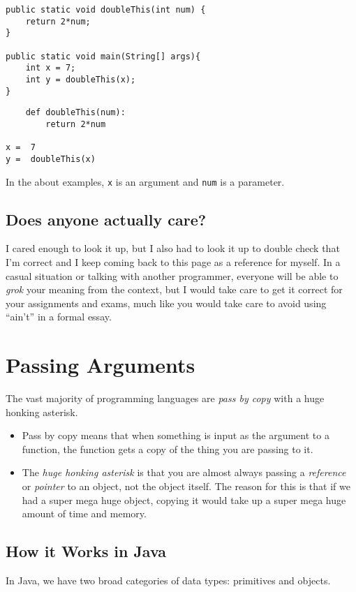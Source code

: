 \begin{verbatim}
public static void doubleThis(int num) { 
	return 2*num;
}

public static void main(String[] args){
	int x = 7;
	int y = doubleThis(x);
}

\end{verbatim}

\begin{verbatim}
	def doubleThis(num): 
		return 2*num
		
x =  7
y =  doubleThis(x)
\end{verbatim}

In the about examples, \texttt{x} is an argument and \texttt{num} is a parameter.


\subsection{Does anyone actually care?}

I cared enough to look it up, but I also had to look it up to double check that I'm correct and I keep coming back to this page as a reference for myself.  
In a casual situation or talking with another programmer, everyone will be able to \textit{grok} your meaning from the context, but I would take care to get it correct for your assignments and exams, much like you would take care to avoid using ``ain't'' in a formal essay.

\section{Passing Arguments}

The vast majority of programming languages are \textit{pass by copy} with a huge honking asterisk.
\begin{itemize}
	\item Pass by copy means that when something is input as the argument to a function, the function gets a copy of the thing you are passing to it.
	\item The \textit{huge honking asterisk} is that you are almost always passing a \textit{reference} or \textit{pointer} to an object, not the object itself.  The reason for this is that if we had a super mega huge object, copying it would take up a super mega huge amount of time and memory.
\end{itemize}



\subsection{How it Works in Java}
In Java, we have two broad categories of data types: primitives and objects.

